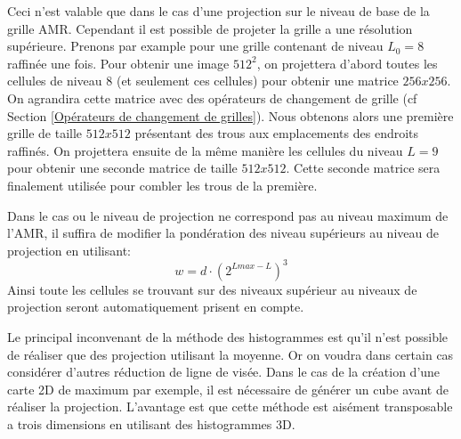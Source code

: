 


Ceci n'est valable que dans le cas d'une projection sur le niveau de base de la grille \ac{AMR}.
Cependant il est possible de projeter la grille a une résolution supérieure.
Prenons par example pour une grille contenant de niveau $L_{0}=8$ raffinée une fois.
Pour obtenir une image $512^2$, on projettera d'abord toutes les cellules de niveau 8 (et seulement ces cellules) pour obtenir une matrice $256x256$.
On agrandira cette matrice avec des opérateurs de changement de grille (cf Section \ref{Opérateurs de changement de grilles}).
Nous obtenons alors une première grille de taille $512x512$ présentant des trous aux emplacements des endroits raffinés.
On projettera ensuite de la même manière les cellules du niveau $L=9$ pour obtenir une seconde matrice de taille $512x512$.
Cette seconde matrice sera finalement utilisée pour combler les trous de la première.

Dans le cas ou le niveau de projection ne correspond pas au niveau maximum de l'\ac{AMR}, il suffira de modifier la pondération des niveau supérieurs au niveau de projection en utilisant:
\begin{equation}
w = d \cdot \left( 2^{Lmax-L} \right)^3
\end{equation}
Ainsi toute les cellules se trouvant sur des niveaux supérieur au niveaux de projection seront automatiquement prisent en compte.

Le principal inconvenant de la méthode des histogrammes est qu'il n'est possible de réaliser que des projection utilisant la moyenne.
Or on voudra dans certain cas considérer d'autres réduction de ligne de visée.
Dans le cas de la création d'une carte 2D de maximum par exemple, il est nécessaire de générer un cube avant de réaliser la projection.
L'avantage est que cette méthode est aisément transposable a trois dimensions en utilisant des histogrammes 3D.


